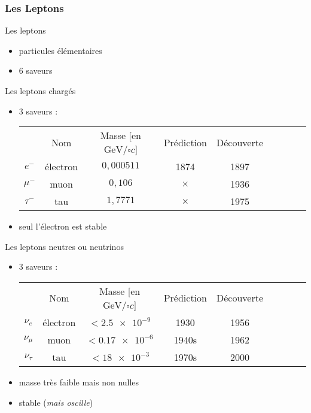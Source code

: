 \documentclass[handout,8pt]{beamer} %
\begin{document}
\subsubsection{Les Leptons}

\begin{frame}{Les leptons}
	
	\begin{itemize}
		\item particules élémentaires
		\item 6 saveurs
	\end{itemize}		
	
	\begin{block}{Les leptons chargés}
		\begin{itemize}
			\item 3 saveurs :
			\begin{tabular}{ c c c c c c c c c }
				& Nom & Masse [en $\si{\GeV\per\square c}$] & Prédiction & Découverte \\
				\textbf{$e^-$} & électron & $0,000511$ & 1874 & 1897 \\
				\textbf{$\mu^-$} & muon & $0,106$ & $\times$ & 1936 \\
				\textbf{$\tau^-$} & tau & $1,7771$ & $\times$ & 1975 \\
			\end{tabular}
			\item seul l'électron est stable
		\end{itemize}
	\end{block}

	\begin{block}{Les leptons neutres ou neutrinos}
		\begin{itemize}
			\item 3 saveurs :
			\begin{tabular}{ c c c c c c c c c }
				& Nom & Masse [en $\si{\GeV\per\square c}$] & Prédiction & Découverte \\
				\textbf{$\nu_e$} & électron & $< \num{2.5e-9}$ & 1930 & 1956 \\
				\textbf{$\nu_\mu$} & muon & $< \num{0.17e-6}$ & 1940s & 1962 \\
				\textbf{$\nu_\tau$} & tau & $< \num{18e-3}$ & 1970s & 2000 \\
			\end{tabular}
			\item masse très faible mais non nulles 
			\item stable (\textit{mais oscille})
		\end{itemize}
	\end{block}

\end{frame}
\end{document}

